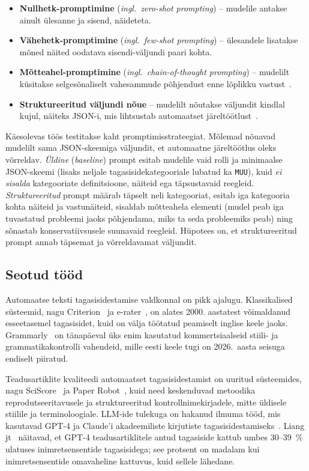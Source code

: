 \begin{itemize}
    \item \textbf{Nullhetk-promptimine} (\emph{ingl.\ zero-shot prompting}) – mudelile antakse ainult ülesanne ja sisend, näideteta.
    \item \textbf{Vähehetk-promptimine} (\emph{ingl.\ few-shot prompting}) – ülesandele lisatakse mõned näited oodatava sisendi-väljundi paari kohta.
    \item \textbf{Mõtteahel-promptimine} (\emph{ingl.\ chain-of-thought prompting}) – mudelilt küsitakse selgesõnaliselt vahesammude põhjendust enne lõplikku vastust~\cite{wei_chain_2022}.
    \item \textbf{Struktureeritud väljundi nõue} – mudelilt nõutakse väljundit kindlal kujul, näiteks JSON-i, mis lihtsustab automaatset järeltöötlust~\cite{geng_structured_2025}.
\end{itemize}

Käesolevas töös testitakse kaht promptimisstrateegiat. Mõlemad nõuavad mudelilt sama JSON-skeemiga väljundit, et automaatne järeltöötlus oleks võrreldav. \emph{Üldine} (\emph{baseline}) prompt esitab mudelile vaid rolli ja minimaalse JSON-skeemi (lisaks neljale tagasisidekategooriale lubatud ka \texttt{MUU}), kuid \emph{ei sisalda} kategooriate definitsioone, näiteid ega täpsustavaid reegleid. \emph{Struktureeritud} prompt määrab täpselt neli kategooriat, esitab iga kategooria kohta näiteid ja vastunäiteid, sisaldab mõtteahela elementi (mudel peab iga tuvastatud probleemi jaoks põhjendama, miks ta seda probleemiks peab) ning sõnastab konservatiivsusele suunavaid reegleid. Hüpotees on, et struktureeritud prompt annab täpsemat ja võrreldavamat väljundit.

\subsection{Seotud tööd} \label{taust:seotud}

Automaatse teksti tagasisidestamise valdkonnal on pikk ajalugu. Klassikalised süsteemid, nagu Criterion~\cite{burstein_criterion_2004} ja e-rater~\cite{attali_erater_2006}, on alates 2000. aastatest võimaldanud esseetasemel tagasisidet, kuid on välja töötatud peamiselt inglise keele jaoks. Grammarly~\cite{grammarly_2024} on tänapäeval üks enim kasutatud kommertsiaalseid stiili- ja grammatikakontrolli vahendeid, mille eesti keele tugi on 2026.~aasta seisuga endiselt piiratud.

Teadusartiklite kvaliteedi automaatset tagasisidestamist on uuritud süsteemides, nagu SciScore~\cite{menke_sciscore_2020} ja Paper Robot~\cite{wang_paperrobot_2019}, kuid need keskenduvad metoodika reprodutseeritavusele ja struktureeritud kontrollnimekirjadele, mitte üldisele stiilile ja terminoloogiale. LLM-ide tulekuga on hakanud ilmuma tööd, mis kasutavad GPT-4 ja Claude'i akadeemiliste kirjutiste tagasisidestamiseks~\cite{liang_chatgpt_2024, kasneci_chatgpt_2023}. Liang jt~\cite{liang_chatgpt_2024} näitavad, et GPT-4 teadusartiklitele antud tagasiside kattub umbes 30--39~\% ulatuses inimretsensentide tagasisidega; see protsent on madalam kui inimretsensentide omavaheline kattuvus, kuid sellele lähedane.

